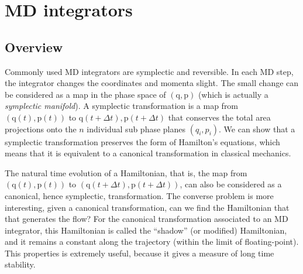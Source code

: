 \documentclass[aip,jcp,preprint,notitlepage, superscriptaddress]{revtex4-1}
\begin{document}
\newcommand{\vct}[1]{\bm{\mathrm{#1}}}
\newcommand{\vx}{\vct{x}}
\newcommand{\vy}{\vct{y}}
\newcommand{\Z}{\mathcal{Z}}
\newcommand{\E}{\mathcal{E}}
\newcommand{\Ham}{\mathcal{H}}
\newcommand{\W}{\mathcal{W}}
\newcommand{\A}{\mathcal{A}}

\newcommand{\repl}[2]{{\color{gray} [#1] }{\color{blue} #2}}
\newcommand{\add}[1]{{\color{blue} #1}}
\newcommand{\del}[1]{{\color{gray} [#1]}}
\newcommand{\note}[1]{{\color{OliveGreen}\small [\textbf{Comment.} #1]}}

\newcommand{\hl}[1]{{\color{red} #1}}

\tableofcontents


\section{MD integrators}


\subsection{Overview}



Commonly used MD integrators are symplectic and reversible.
%
In each MD step,
the integrator changes the coordinates and momenta slight.
%
The small change can be considered as a map
in the phase space of $(\vct q, \vct p)$
(which is actually a \emph{symplectic manifold}).
%
A symplectic transformation is a map
from $(\vct q(t), \vct p(t))$
to $\vct q(t + \Delta t), \vct p(t + \Delta t)$
that conserves the total area projections
onto the $n$ individual sub phase planes $(q_i, p_i)$.
%
We can show that a symplectic transformation
preserves the form of Hamilton's equations,
which means that it is equivalent to
a canonical transformation in classical mechanics.


The natural time evolution of a Hamiltonian,
that is, the map from $(\vct q(t), \vct p(t))$
to $(\vct q(t+\Delta t), \vct p(t+\Delta t))$,
can also be considered as a canonical, hence symplectic, transformation.
%
The converse problem is more interesting,
given a canonical transformation,
can we find the Hamiltonian that that generates the flow?
%
For the canonical transformation associated to an MD integrator,
this Hamiltonian is called the ``shadow''
(or modified) Hamiltonian,
and it remains a constant along the trajectory
(within the limit of floating-point).
%
This properties is extremely useful,
because it gives a measure of long time stability.
\end{document}
